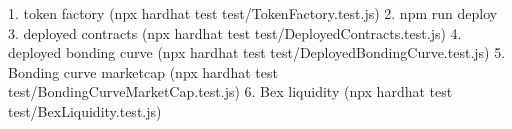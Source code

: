 1. token factory (npx hardhat test test/TokenFactory.test.js)
2. npm run deploy 
3. deployed contracts (npx hardhat test test/DeployedContracts.test.js)
4. deployed bonding curve (npx hardhat test test/DeployedBondingCurve.test.js)
5. Bonding curve marketcap (npx hardhat test test/BondingCurveMarketCap.test.js)
6. Bex liquidity (npx hardhat test test/BexLiquidity.test.js)
